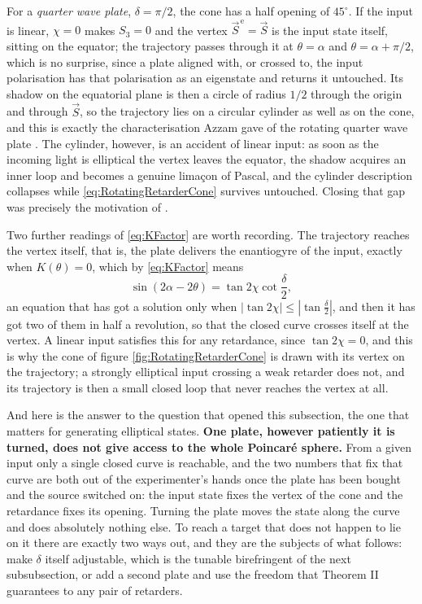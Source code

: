             For a \emph{quarter wave plate}, $\delta=\pi/2$, the cone has a half opening of $45^{\circ}$. If the input is linear, $\chi=0$ makes $S_3=0$ and the vertex $\vec{S}^{\,\text{e}}=\vec{S}$ is the input state itself, sitting on the equator; the trajectory passes through it at $\theta=\alpha$ and $\theta=\alpha+\pi/2$, which is no surprise, since a plate aligned with, or crossed to, the input polarisation has that polarisation as an eigenstate and returns it untouched. Its shadow on the equatorial plane is then a circle of radius $1/2$ through the origin and through $\vec{S}$, so the trajectory lies on a circular cylinder as well as on the cone, and this is exactly the characterisation Azzam gave of the rotating quarter wave plate \citep{azzam2000poincare}. The cylinder, however, is an accident of linear input: as soon as the incoming light is elliptical the vertex leaves the equator, the shadow acquires an inner loop and becomes a genuine limaçon of Pascal, and the cylinder description collapses while \ref{eq:RotatingRetarderCone} survives untouched. Closing that gap was precisely the motivation of \citep{salazar2021dinamica}.

            Two further readings of \ref{eq:KFactor} are worth recording. The trajectory reaches the vertex itself, that is, the plate delivers the enantiogyre of the input, exactly when $K(\theta)=0$, which by \ref{eq:KFactor} means
            \begin{equation}\label{eq:VertexCondition}
                \sin\left(2\alpha-2\theta\right) = \tan2\chi\cot\frac{\delta}{2},
            \end{equation}
            an equation that has got a solution only when $\left|\tan2\chi\right|\leq\left|\tan\frac{\delta}{2}\right|$, and then it has got two of them in half a revolution, so that the closed curve crosses itself at the vertex. A linear input satisfies this for any retardance, since $\tan2\chi=0$, and this is why the cone of figure \ref{fig:RotatingRetarderCone} is drawn with its vertex on the trajectory; a strongly elliptical input crossing a weak retarder does not, and its trajectory is then a small closed loop that never reaches the vertex at all.

            And here is the answer to the question that opened this subsection, the one that matters for generating elliptical states. \textbf{One plate, however patiently it is turned, does not give access to the whole Poincaré sphere.} From a given input only a single closed curve is reachable, and the two numbers that fix that curve are both out of the experimenter's hands once the plate has been bought and the source switched on: the input state fixes the vertex of the cone and the retardance fixes its opening. Turning the plate moves the state along the curve and does absolutely nothing else. To reach a target that does not happen to lie on it there are exactly two ways out, and they are the subjects of what follows: make $\delta$ itself adjustable, which is the tunable birefringent of the next subsubsection, or add a second plate and use the freedom that Theorem II guarantees to any pair of retarders.

